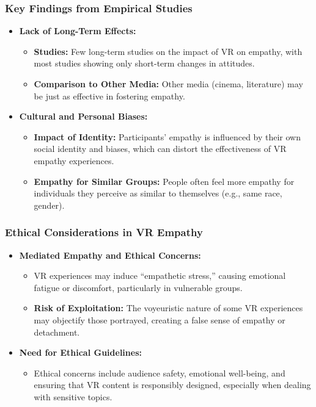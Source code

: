 \documentclass[aspectratio=169,xcolor=dvipsnames]{beamer}
\begin{document}
\begin{frame}
\frametitle{Key Findings from Empirical Studies}
\begin{itemize}
    \item \textbf{Lack of Long-Term Effects:}
    \begin{itemize}
        \item \textbf{Studies:} Few long-term studies on the impact of VR on empathy, with most studies showing only short-term changes in attitudes.
        \item \textbf{Comparison to Other Media:} Other media (cinema, literature) may be just as effective in fostering empathy.
    \end{itemize}
    \item \textbf{Cultural and Personal Biases:}
    \begin{itemize}
        \item \textbf{Impact of Identity:} Participants’ empathy is influenced by their own social identity and biases, which can distort the effectiveness of VR empathy experiences.
        \item \textbf{Empathy for Similar Groups:} People often feel more empathy for individuals they perceive as similar to themselves (e.g., same race, gender).
    \end{itemize}
\end{itemize}
\end{frame}

\begin{frame}
\frametitle{Ethical Considerations in VR Empathy}
\begin{itemize}
    \item \textbf{Mediated Empathy and Ethical Concerns:}
    \begin{itemize}
        \item VR experiences may induce “empathetic stress,” causing emotional fatigue or discomfort, particularly in vulnerable groups.
        \item \textbf{Risk of Exploitation:} The voyeuristic nature of some VR experiences may objectify those portrayed, creating a false sense of empathy or detachment.
    \end{itemize}
    \item \textbf{Need for Ethical Guidelines:}
    \begin{itemize}
        \item Ethical concerns include audience safety, emotional well-being, and ensuring that VR content is responsibly designed, especially when dealing with sensitive topics.
    \end{itemize}
\end{itemize}
\end{frame}
\end{document}
